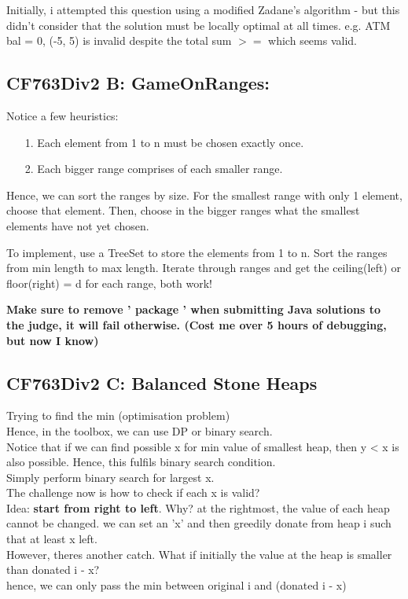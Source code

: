 \documentclass[12pt]{article}
\begin{document}
 Initially, i attempted this question using a modified Zadane's algorithm - but this didn't consider that the solution must be locally optimal at all times. 
 e.g. ATM bal = 0, (-5, 5) is invalid despite the total sum \(>=\) which seems valid. 
 
 \subsection{CF763Div2 B: GameOnRanges:}
 Notice a few heuristics: 
 \begin{itemize} 
 	\item[1.] Each element from 1 to n must be chosen exactly once. 
	\item[2.] Each bigger range comprises of each smaller range. 
 \end{itemize} 

Hence, we can sort the ranges by size. 
For the smallest range with only 1 element, choose that element. 
Then, choose in the bigger ranges what the smallest elements have not yet chosen. 

To implement, use a TreeSet to store the elements from 1 to n. 
Sort the ranges from min length to max length. 
Iterate through ranges and get the ceiling(left) or floor(right) = d for each range, both work! 

\textbf{Make sure to remove ' package ' when submitting Java solutions to the judge, it will fail otherwise. (Cost me over 5 hours of debugging, but now I know)} 

\subsection{CF763Div2 C: Balanced Stone Heaps} 
Trying to find the min (optimisation problem) \\
Hence, in the toolbox, we can use DP or binary search. \\ [\baselineskip] 

Notice that if we can find possible x for min value of smallest heap, then y < x is also possible. Hence, this fulfils binary search condition. \\
Simply perform binary search for largest x. \\ [\baselineskip]

The challenge now is how to check if each x is valid? \\
Idea: {\textbf{start from right to left}}. Why? at the rightmost, the value of each heap cannot be changed. we can set an 'x' and then greedily donate from heap i such that at least x left. \\
However, theres another catch. What if initially the value at the heap is smaller than donated i - x? \\ 
hence, we can only pass the min between original i and (donated i - x) \\ [\baselineskip]
\end{document}

